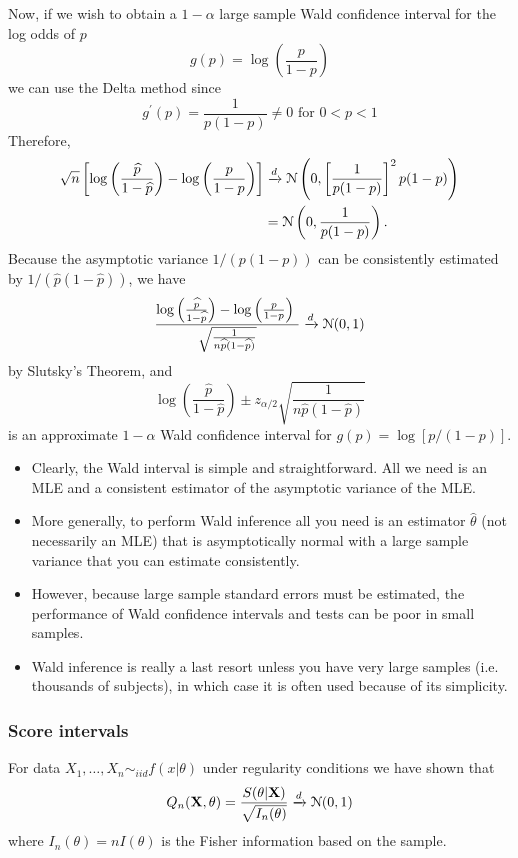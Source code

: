 \documentclass[11pt,]{article}
\newcommand{\Xndots}{X_1, \ldots, X_n}
\def\bX{{\bf X}}
\def\phat{{\widehat p}}
\def\thetahat{{\widehat\theta}}
\def\Nsc{{\cal N}}
\begin{document}
Now, if we wish to obtain a \(1-\alpha\) large sample Wald confidence
interval for the log odds of \(p\)
\[g(p) = \log \left( \frac{p}{1-p}\right)\] we can use the Delta method
since \[g^\prime (p) = \frac{1}{p(1-p)} \neq 0 \mbox{ for } 0<p<1\]
Therefore, \begin{align*}
\sqrt{n} \left[ \log \left( \frac{\phat}{1-\phat}\right) - \log \left( \frac{p}{1-p}\right) \right] &\xrightarrow{d} \Nsc\left(0,\left[\frac{1}{p(1-p)}\right]^2p(1-p)\right)\\
&= \Nsc\left(0, \frac{1}{p(1-p)}\right).
\end{align*} Because the asymptotic variance \(1/(p(1-p))\) can be
consistently estimated by \(1/(\phat(1-\phat))\), we have \[\frac{
\log \left( \frac{\phat}{1-\phat}\right) - \log \left( \frac{p}{1-p}\right) \
}{
\sqrt{\frac{1}{n\phat(1-\phat)}}
}\xrightarrow{d} \Nsc(0,1)\] by Slutsky's Theorem, and
\[\log\left(\frac{\phat}{1-\phat}\right) \pm z_{\alpha/2} \sqrt{\frac{1}{n\phat(1-\phat)}}\]
is an approximate \(1-\alpha\) Wald confidence interval for
\(g(p) = \log[p/(1-p)]\).

\begin{itemize}
\item Clearly, the Wald interval is simple and straightforward. All we need is an MLE and a consistent estimator of the asymptotic variance of the MLE.
\item More generally, to perform Wald inference all you need is an estimator $\thetahat$ (not necessarily an MLE) that is asymptotically normal with a large sample variance that you can estimate consistently.
\item However, because large sample standard errors must be estimated, the performance of Wald confidence intervals and tests can be poor in small samples.
\item Wald inference is really a last resort unless you have very large samples (i.e. thousands of subjects), in which case it is often used because of its simplicity.\end{itemize}

\subsubsection{Score intervals}

For data \(\Xndots \sim_{iid} f(x|\theta)\) under regularity conditions
we have shown that
\[Q_n(\bX,\theta) = \frac{S(\theta|\bX)}{\sqrt{I_n(\theta)}}\xrightarrow{d} \Nsc(0,1)\]
where \(I_n(\theta) = nI(\theta)\) is the Fisher information based on
the sample.
\end{document}
